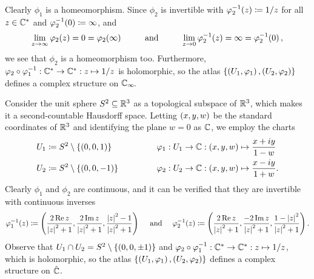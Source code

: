 \documentclass[../Moduli_Spaces_of_Riemann_Surfaces.tex]{subfiles}
\begin{document}
\begin{example}
\begin{equation*}
        \end{equation*}
        Clearly $\phi_1$ is a homeomorphism. Since $\phi_2$ is invertible with $\varphi_2^{-1}\!\left(z\right)\coloneqq1/z$ for all $z\in\mathbb{C}^\ast$ and $\varphi_2^{-1}\!\left(0\right)\coloneqq\infty$, and
        \begin{equation*}
            \lim\limits_{z\to\infty}\phi_2\!\l(z\r)=0=\phi_2\!\l(\infty\r)\ \ \ \ \ \ \ \ \textrm{and}\ \ \ \ \ \ \ \ \lim\limits_{z\to0}\phi_2^{-1}\!\l(z\r)=\infty=\phi_2^{-1}\!\l(0\r),
        \end{equation*}
        we see that $\phi_2$ is a homeomorphism too. Furthermore, $\varphi_2\circ\varphi_1^{-1}:\mathbb{C}^\ast\to\mathbb{C}^\ast:z\mapsto1/z$ is holomorphic, so the atlas $\left\{\left(U_1,\varphi_1\right),\left(U_2,\varphi_2\right)\right\}$ defines a complex structure on $\mathbb{C}_\infty\!$.\exqed
    \end{example}
    \begin{example}\label{RS:exa:stereographic_projection}
        Consider the unit sphere $S^2\subseteq\mathbb{R}^3$ as a topological subspace of $\mathbb{R}^3$, which makes it a second-countable Hausdorff space. Letting $\left(x,y,w\right)$ be the standard coordinates of $\mathbb{R}^3$ and identifying the plane $w=0$ as $\mathbb{C}$, we employ the charts
        \begin{equation*}
            \begin{alignedat}{2}
                U_1&\coloneqq S^2\comp\l\{\l(0,0,1\r)\r\}\ \ \ \ \ \ \ \ \ \ \ \ \ \ \ \ &&\phi_1:U_1\to\C:\tpl{x,y,w}\mapsto\frac{x+iy}{1-w} \\
                U_2&\coloneqq S^2\comp\l\{\l(0,0,-1\r)\r\}&&\phi_2:U_2\to\C:\tpl{x,y,w}\mapsto\frac{x-iy}{1+w}.
            \end{alignedat}
        \end{equation*}
        Clearly $\phi_1$ and $\phi_2$ are continuous, and it can be verified that they are invertible with continuous inverses
        \begin{equation*}
            \phi_1^{-1}\!\l(z\r)\coloneqq\tpl{\frac{2\Re z}{\l|z\r|^2+1},\frac{2\Im z}{\l|z\r|^2+1},\frac{\l|z\r|^2-1}{\l|z\r|^2+1}}\ \ \ \ \textrm{and}\ \ \ \ \phi_2^{-1}\!\l(z\r)\coloneqq\tpl{\frac{2\Re z}{\l|z\r|^2+1},\frac{-2\Im z}{\l|z\r|^2+1},\frac{1-\l|z\r|^2}{\l|z\r|^2+1}}.
        \end{equation*}
        Observe that $U_1\cap U_2=S^2\setminus\left\{\left(0,0,\pm1\right)\right\}$ and $\varphi_2\circ\varphi_1^{-1}:\mathbb{C}^\ast\to\mathbb{C}^\ast:z\mapsto1/z$, which is holomorphic, so the atlas $\left\{\left(U_1,\varphi_1\right),\left(U_2,\varphi_2\right)\right\}$ defines a complex structure on $\hat{\mathbb{C}}$.\exqed
    \end{example}
\end{document}
